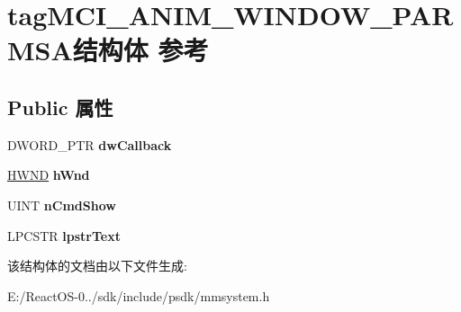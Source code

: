 \hypertarget{structtag_m_c_i___a_n_i_m___w_i_n_d_o_w___p_a_r_m_s_a}{}\section{tag\+M\+C\+I\+\_\+\+A\+N\+I\+M\+\_\+\+W\+I\+N\+D\+O\+W\+\_\+\+P\+A\+R\+M\+S\+A结构体 参考}
\label{structtag_m_c_i___a_n_i_m___w_i_n_d_o_w___p_a_r_m_s_a}
\subsection*{Public 属性}
\begin{DoxyCompactItemize}
\item 
\mbox{\label{structtag_m_c_i___a_n_i_m___w_i_n_d_o_w___p_a_r_m_s_a_a94f34c23d9d7dd801a4c8d8e82632647}} 
D\+W\+O\+R\+D\+\_\+\+P\+TR {\bfseries dw\+Callback}
\item 
\mbox{\label{structtag_m_c_i___a_n_i_m___w_i_n_d_o_w___p_a_r_m_s_a_abe0779545ee21f249bba01b771204a8f}} 
\hyperlink{interfacevoid}{H\+W\+ND} {\bfseries h\+Wnd}
\item 
\mbox{\label{structtag_m_c_i___a_n_i_m___w_i_n_d_o_w___p_a_r_m_s_a_af0d329f6ad737ad1a534228b4f74abf5}} 
U\+I\+NT {\bfseries n\+Cmd\+Show}
\item 
\mbox{\label{structtag_m_c_i___a_n_i_m___w_i_n_d_o_w___p_a_r_m_s_a_a9a21943af8c6ac27ba5e77127a5ef59c}} 
L\+P\+C\+S\+TR {\bfseries lpstr\+Text}
\end{DoxyCompactItemize}


该结构体的文档由以下文件生成\+:\begin{DoxyCompactItemize}
\item 
E\+:/\+React\+O\+S-\/0../sdk/include/psdk/mmsystem.\+h\end{DoxyCompactItemize}
